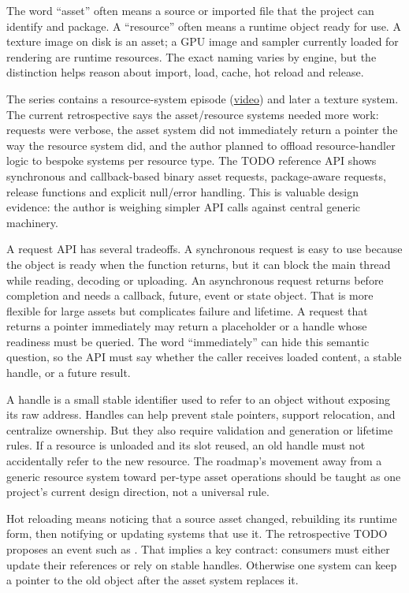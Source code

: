 \hypertarget{06-engine-ii-ch027-resource-and-asset-systems-are-about-reliable-identity-and-lifetime}{}

The word ``asset'' often means a source or imported file that the project can identify and package. A ``resource'' often means a runtime object ready for use. A texture image on disk is an asset; a GPU image and sampler currently loaded for rendering are runtime resources. The exact naming varies by engine, but the distinction helps reason about import, load, cache, hot reload and release.

The series contains a resource-system episode (\href{https://www.youtube.com/watch?v=ubin1HH_kqw}{video}) and later a texture system. The current retrospective says the asset/resource systems needed more work: requests were verbose, the asset system did not immediately return a pointer the way the resource system did, and the author planned to offload resource-handler logic to bespoke systems per resource type. The TODO reference API shows synchronous and callback-based binary asset requests, package-aware requests, release functions and explicit null/error handling. This is valuable design evidence: the author is weighing simpler API calls against central generic machinery.

A request API has several tradeoffs. A synchronous request is easy to use because the object is ready when the function returns, but it can block the main thread while reading, decoding or uploading. An asynchronous request returns before completion and needs a callback, future, event or state object. That is more flexible for large assets but complicates failure and lifetime. A request that returns a pointer immediately may return a placeholder or a handle whose readiness must be queried. The word ``immediately'' can hide this semantic question, so the API must say whether the caller receives loaded content, a stable handle, or a future result.

A handle is a small stable identifier used to refer to an object without exposing its raw address. Handles can help prevent stale pointers, support relocation, and centralize ownership. But they also require validation and generation or lifetime rules. If a resource is unloaded and its slot reused, an old handle must not accidentally refer to the new resource. The roadmap's movement away from a generic resource system toward per-type asset operations should be taught as one project's current design direction, not a universal rule.

Hot reloading means noticing that a source asset changed, rebuilding its runtime form, then notifying or updating systems that use it. The retrospective TODO proposes an event such as . That implies a key contract: consumers must either update their references or rely on stable handles. Otherwise one system can keep a pointer to the old object after the asset system replaces it.

